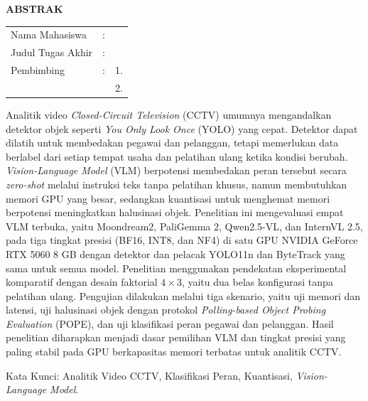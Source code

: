 \begin{center}
  \large\textbf{ABSTRAK}
\end{center}


\vspace{2ex}

\begingroup
\setlength{\tabcolsep}{0pt}

\noindent
\begin{tabularx}{\textwidth}{l >{\centering}m{2em} X}
  Nama Mahasiswa    & : & \name{}         \\

  Judul Tugas Akhir & : & \tatitle{}      \\

  Pembimbing        & : & 1. \advisor{}   \\
                    &   & 2. \coadvisor{} \\
\end{tabularx} 
\endgroup

Analitik video \textit{Closed-Circuit Television} (CCTV) umumnya mengandalkan detektor objek seperti \textit{You Only Look Once} (YOLO) yang cepat. Detektor dapat dilatih untuk membedakan pegawai dan pelanggan, tetapi memerlukan data berlabel dari setiap tempat usaha dan pelatihan ulang ketika kondisi berubah. \textit{Vision-Language Model} (VLM) berpotensi membedakan peran tersebut secara \textit{zero-shot} melalui instruksi teks tanpa pelatihan khusus, namun membutuhkan memori GPU yang besar, sedangkan kuantisasi untuk menghemat memori berpotensi meningkatkan halusinasi objek. Penelitian ini mengevaluasi empat VLM terbuka, yaitu Moondream2, PaliGemma 2, Qwen2.5-VL, dan InternVL 2.5, pada tiga tingkat presisi (BF16, INT8, dan NF4) di satu GPU NVIDIA GeForce RTX 5060 8 GB dengan detektor dan pelacak YOLO11n dan ByteTrack yang sama untuk semua model. Penelitian menggunakan pendekatan eksperimental komparatif dengan desain faktorial $4 \times 3$, yaitu dua belas konfigurasi tanpa pelatihan ulang. Pengujian dilakukan melalui tiga skenario, yaitu uji memori dan latensi, uji halusinasi objek dengan protokol \textit{Polling-based Object Probing Evaluation} (POPE), dan uji klasifikasi peran pegawai dan pelanggan. Hasil penelitian diharapkan menjadi dasar pemilihan VLM dan tingkat presisi yang paling stabil pada GPU berkapasitas memori terbatas untuk analitik CCTV.

Kata Kunci: Analitik Video CCTV, Klasifikasi Peran, Kuantisasi, \textit{Vision-Language Model}.
